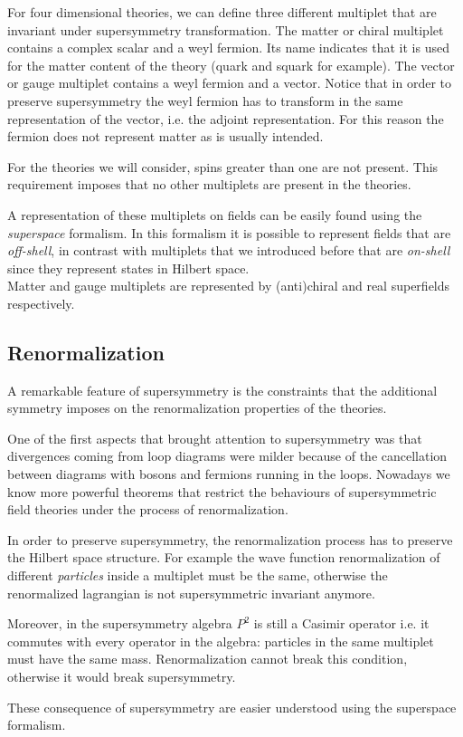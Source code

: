 For four dimensional theories, we can define three different multiplet that are invariant under supersymmetry transformation.
The matter or chiral multiplet contains a complex scalar and a weyl fermion. Its name indicates that it is used for the matter content of the theory (quark and squark for example).
The vector or gauge multiplet contains a weyl fermion and a vector. 
Notice that in order to preserve supersymmetry the weyl fermion has to transform in the same representation of the vector, i.e. the adjoint representation.
For this reason the fermion does not represent matter as is usually intended.

For the theories we will consider, spins greater than one are not present.
This requirement imposes that no other multiplets are present in the theories.

A representation of these multiplets on fields can be easily found using the \emph{superspace} formalism.
In this formalism it is possible to represent fields  that are \emph{off-shell}, in contrast with multiplets that we introduced before that are \emph{on-shell} since they represent states in Hilbert space.\\
Matter and gauge multiplets are represented by (anti)chiral and real superfields respectively.



\subsection{ Renormalization }

A remarkable feature of supersymmetry is the constraints that the additional symmetry imposes on the renormalization properties of the theories.

One of the first aspects that brought attention to supersymmetry was that divergences coming from loop diagrams were milder because of the cancellation between diagrams with bosons and fermions running in the loops. 
Nowadays we know more powerful theorems that restrict the behaviours of supersymmetric field theories under the process of renormalization.

In order to preserve supersymmetry, the renormalization process has to preserve the Hilbert space structure. For example the wave function renormalization of different \emph{ particles} inside a multiplet must be the same, otherwise the renormalized lagrangian is not supersymmetric invariant anymore. 

Moreover, in the supersymmetry algebra $P^2$ is still a Casimir operator i.e. it commutes with every operator in the algebra: particles in the same multiplet must have the same mass.
Renormalization cannot break this condition, otherwise it would break supersymmetry.

These consequence of supersymmetry are easier understood using the superspace formalism. 